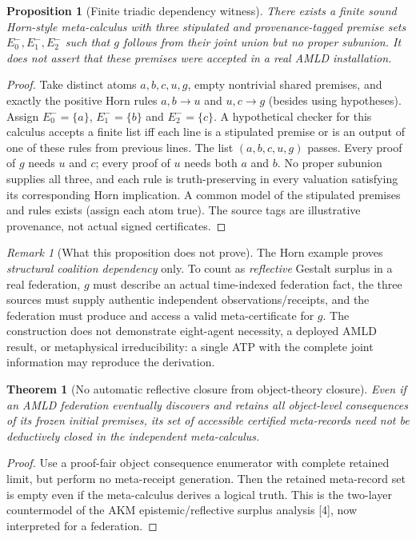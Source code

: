 \documentclass[10pt,letterpaper]{article}
\newtheorem{theorem}[definition]{Theorem}
\newtheorem{proposition}[definition]{Proposition}
\theoremstyle{remark}\newtheorem{remark}[definition]{Remark}
\begin{document}
\begin{proposition}[Finite triadic dependency witness]
There exists a finite sound Horn-style meta-calculus with three \emph{stipulated and provenance-tagged} premise sets $E_0^-,E_1^-,E_2^-$ such that $g$ follows from their joint union but no proper subunion. It does \emph{not} assert that these premises were accepted in a real AMLD installation.
\end{proposition}
\begin{proof}
Take distinct atoms $a,b,c,u,g$, empty nontrivial shared premises, and exactly the positive Horn rules $a,b\to u$ and $u,c\to g$ (besides using hypotheses). Assign $E_0^-=\{a\}$, $E_1^-=\{b\}$ and $E_2^-=\{c\}$. A hypothetical checker for this calculus accepts a finite list iff each line is a stipulated premise or is an output of one of these rules from previous lines. The list $(a,b,c,u,g)$ passes. Every proof of $g$ needs $u$ and $c$; every proof of $u$ needs both $a$ and $b$. No proper subunion supplies all three, and each rule is truth-preserving in every valuation satisfying its corresponding Horn implication. A common model of the stipulated premises and rules exists (assign each atom true). The source tags are illustrative provenance, not actual signed certificates.
\end{proof}

\begin{remark}[What this proposition does not prove]
The Horn example proves \emph{structural coalition dependency} only. To count as \emph{reflective} Gestalt surplus in a real federation, $g$ must describe an actual time-indexed federation fact, the three sources must supply authentic independent observations/receipts, and the federation must produce and access a valid meta-certificate for $g$. The construction does not demonstrate eight-agent necessity, a deployed AMLD result, or metaphysical irreducibility: a single ATP with the complete joint information may reproduce the derivation.
\end{remark}

\begin{theorem}[No automatic reflective closure from object-theory closure]
Even if an AMLD federation eventually discovers and retains all object-level consequences of its frozen initial premises, its set of accessible certified meta-records need not be deductively closed in the independent meta-calculus.
\end{theorem}
\begin{proof}
Use a proof-fair object consequence enumerator with complete retained limit, but perform no meta-receipt generation. Then the retained meta-record set is empty even if the meta-calculus derives a logical truth. This is the two-layer countermodel of the AKM epistemic/reflective surplus analysis [4], now interpreted for a federation.
\end{proof}
\end{document}

